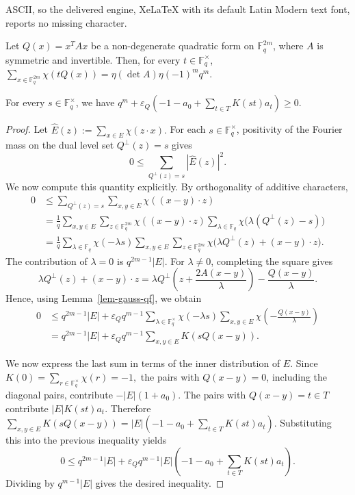 \documentclass[10pt,a4paper]{amsart}
\newcommand{\F}{\mathbb{F}}
\begin{document}
ASCII, so the delivered engine, XeLaTeX with its default Latin Modern text font, reports no missing character.
\begin{lemma}\label{lem-gauss-qf}
	Let \(Q(x)=x^T A x\) be a non-degenerate quadratic form on \(\mathbb{F}_q^{2m}\), where \(A\) is symmetric and invertible. Then, for every \(t\in\mathbb{F}_q^\times\), $\sum_{x\in\mathbb{F}_q^{2m}}\chi(tQ(x))
	=
	\eta(\det A)\eta(-1)^m q^m.$
\end{lemma}

\begin{proposition}\label{prop-lp-constraints}
	For every \(s\in\F_q^\times\), we have $q^m+\varepsilon_Q
	\left(
	-1-a_0+\sum_{t\in T}K(st)a_t
	\right)
	\ge0.$
\end{proposition}

\begin{proof}
	Let $\widehat{E}(z):=\sum_{x\in E}\chi(z\cdot x).$
	For each \(s\in\F_q^\times\), positivity of the Fourier mass on the dual
	level set \(Q^\perp(z)=s\) gives
	\[
	0
	\le
	\sum_{Q^\perp(z)=s}|\widehat{E}(z)|^2.
	\]
	We now compute this quantity explicitly. By orthogonality of additive
	characters,
	\begin{align*}
		0
		&\le
		\sum_{Q^\perp(z)=s}
		\sum_{x,y\in E}\chi((x-y)\cdot z) \\
		&=
		\frac1q
		\sum_{x,y\in E}
		\sum_{z\in\F_q^{2m}}
		\chi((x-y)\cdot z)
		\sum_{\lambda\in\F_q}
		\chi\bigl(\lambda(Q^\perp(z)-s)\bigr) \\
		&=
		\frac1q
		\sum_{\lambda\in\F_q}
		\chi(-\lambda s)
		\sum_{x,y\in E}
		\sum_{z\in\F_q^{2m}}
		\chi\bigl(\lambda Q^\perp(z)+(x-y)\cdot z\bigr).
	\end{align*}
	The contribution of \(\lambda=0\) is $q^{2m-1}|E|.$
	For \(\lambda\ne0\), completing the square gives
	\[
	\lambda Q^\perp(z)+(x-y)\cdot z
	=
	\lambda Q^\perp\left(z+\frac{2A(x-y)}{\lambda}\right)
	-
	\frac{Q(x-y)}{\lambda}.
	\]
	Hence, using Lemma~\ref{lem-gauss-qf}, we obtain
	\begin{align*}
		0
		&\le
		q^{2m-1}|E|
		+
		\varepsilon_Q q^{m-1}
		\sum_{\lambda\in\F_q^\times}
		\chi(-\lambda s)
		\sum_{x,y\in E}
		\chi\left(-\frac{Q(x-y)}{\lambda}\right) \\
		&=
		q^{2m-1}|E|
		+
		\varepsilon_Q q^{m-1}
		\sum_{x,y\in E}
		K(sQ(x-y)).
	\end{align*}
	
	We now express the last sum in terms of the inner distribution of \(E\).
	Since $K(0)=\sum_{r\in\F_q^\times}\chi(r)=-1,$
	the pairs with \(Q(x-y)=0\), including the diagonal pairs, contribute $-|E|(1+a_0).$
	The pairs with \(Q(x-y)=t\in T\) contribute $|E|K(st)a_t.$
	Therefore $\sum_{x,y\in E}K(sQ(x-y))
	=
	|E|
	\left(
	-1-a_0+\sum_{t\in T}K(st)a_t
	\right).$
	Substituting this into the previous inequality yields
	\[
	0
	\le
	q^{2m-1}|E|
	+
	\varepsilon_Q q^{m-1}|E|
	\left(
	-1-a_0+\sum_{t\in T}K(st)a_t
	\right).
	\]
	Dividing by \(q^{m-1}|E|\) gives the desired inequality.
\end{proof}
\end{document}
